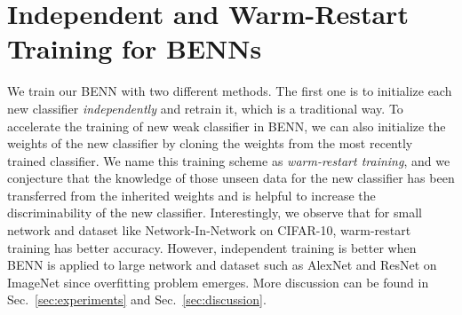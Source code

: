 \documentclass[10pt,twocolumn,letterpaper]{article}
\begin{document}
\vspace{-12mm}

\section{Independent and Warm-Restart Training for BENNs}
\label{sec:training}

We train our BENN with two different methods. The first one is to initialize each new classifier \emph{independently} and retrain it, which is a traditional way. To accelerate the training of new weak classifier in BENN, we can also initialize the weights of the new classifier by cloning the weights from the most recently trained classifier. We name this training scheme as \emph{warm-restart training}, and we conjecture that the knowledge of those unseen data for the new classifier has been transferred from the inherited weights and is helpful to increase the discriminability of the new classifier.  %
Interestingly, we observe that for small network and dataset like Network-In-Network \cite{lin2013network} on CIFAR-10, warm-restart training has better accuracy. However, independent training is better when BENN is applied to large network and dataset such as AlexNet \cite{krizhevsky2012imagenet} and ResNet \cite{he2016deep} on ImageNet since overfitting problem emerges. More discussion can be found in Sec.~\ref{sec:experiments} and Sec.~\ref{sec:discussion}.
\vspace{-4mm}
\end{document}
